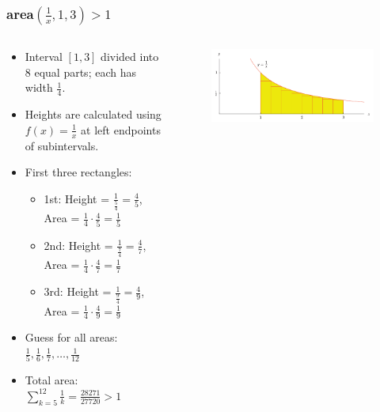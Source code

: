 \documentclass{beamer}
\begin{document}
\begin{frame}
  \frametitle{area\((\frac{1}{x},1,3) > 1 \) }
  \begin{columns}
    \begin{column}{0.5\textwidth}
      \begin{itemize}
        \item Interval \([1, 3]\) divided into 8 equal parts; each has width \(\frac{1}{4}\).
        \item Heights are calculated using \(f(x) = \frac{1}{x}\) at left endpoints of subintervals.
        \item First three rectangles:
        \begin{itemize}
            \item 1st: Height = \(\frac{1}{\frac{5}{4}} = \frac{4}{5}\), Area = \(\frac{1}{4} \cdot \frac{4}{5} = \frac{1}{5}\)
            \item 2nd: Height = \(\frac{1}{\frac{7}{4}} = \frac{4}{7}\), Area = \(\frac{1}{4} \cdot \frac{4}{7} = \frac{1}{7}\)
            \item 3rd: Height = \(\frac{1}{\frac{9}{4}} = \frac{4}{9}\), Area = \(\frac{1}{4} \cdot \frac{4}{9} = \frac{1}{9}\)
        \end{itemize}
        \item Guess for all areas: \(\frac{1}{5}, \frac{1}{6}, \frac{1}{7}, \dots, \frac{1}{12}\)
        \item Total area: \(\sum_{k=5}^{12} \frac{1}{k} = \frac{28271}{27720} > 1\)
        
      \end{itemize}
    \end{column}
    \begin{column}{0.5\textwidth}
      \begin{figure}
        \includegraphics[scale=0.28]{e_3.png}
      \end{figure}
    \end{column}
  \end{columns}
\end{frame}
\end{document}
